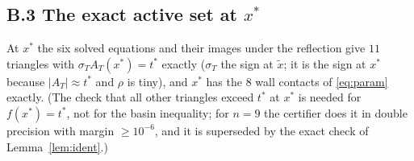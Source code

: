 \documentclass[11pt]{amsart}
\theoremstyle{definition}
\newcommand{\tstar}{t^{*}}
\begin{document}
\subsection*{\texorpdfstring{B.3 The exact active set at $x^*$}{B.3 The exact active set at x*}}
At $x^*$ the six solved equations and their images under the reflection give $11$ triangles with $\sigma_TA_T(x^*) = \tstar$ exactly ($\sigma_T$ the sign at $\tilde x$; it is the sign at $x^*$ because $\lvert A_T\rvert \approx \tstar$ and $\rho$ is tiny), and $x^*$ has the $8$ wall contacts of \eqref{eq:param} exactly. (The check that all other triangles exceed $\tstar$ at $x^*$ is needed for $f(x^*) = \tstar$, not for the basin inequality; for $n = 9$ the certifier does it in double precision with margin $\ge 10^{-6}$, and it is superseded by the exact check of Lemma~\ref{lem:ident}.)
\end{document}
